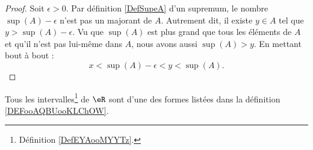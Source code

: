 \begin{proof}
	Soit \( \epsilon>0\). Par définition \ref{DefSupeA} d'un supremum, le nombre \( \sup(A)-\epsilon\) n'est pas un majorant de \( A\). Autrement dit, il existe \( y\in A\) tel que \( y>\sup(A)-\epsilon\). Vu que \( \sup(A)\) est plus grand que tous les éléments de \( A\) et qu'il n'est pas lui-même dans \( A\), nous avons aussi \( \sup(A)>y\). En mettant bout à bout :
	\begin{equation}
		x<\sup(A)-\epsilon<y<\sup(A).
	\end{equation}
\end{proof}

\begin{proposition}     \label{PROPooHPMWooQJXCAS}
	Tous les intervalles\footnote{Définition \ref{DefEYAooMYYTz}.} de \( \eR\) sont d'une des formes listées dans la définition \ref{DEFooAQBUooKLChOW}.
\end{proposition}

